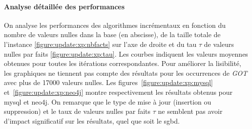 \paragraph{Analyse détaillée des performances}
On analyse les performances des algorithmes incrémentaux en fonction du nombre de valeurs nulles dans la base (en abscisse), de la taille totale de l'instance \ref{figure:update:xp:nbfacts} sur l'axe de droite et du tau $\tau$ de valeurs nulles par faits \ref{figure:update:xp:tau}.
Les courbes indiquent les valeurs moyennes obtenues pour toutes les itérations correspondantes.
Pour améliorer la lisibilité, les graphiques ne tiennent pas compte des résultats pour les occurrences de \textit{GOT} avec plus de \num{17000} valeurs nulles.
Les figures~\ref{figure:update:xp:mysql} et~\ref{figure:update:xp:neo4j} montre respectivement les résultats obtenus pour \gls{mysql} et \gls{neo4j}.
On remarque que le type de mise à jour (insertion ou suppression) et le taux de valeurs nulles par faits $\tau$ ne semblent pas avoir d'impact significatif sur les résultats, quel que soit le \gls{sgbd}.

